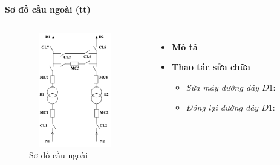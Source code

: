 \documentclass{beamer}
\begin{document}
\begin{frame}{\textbf{Sơ đồ cầu ngoài (tt)}}
\begin{columns}
\begin{figure}[h]
\includegraphics[width=4cm, height=5cm]{sdcn}
\caption{Sơ đồ cầu ngoài}
\end{figure}

\begin{itemize}
\item \textbf{Mô tả}
\item  \textbf{Thao tác sửa chữa}
\begin{itemize}
\item<1-> \emph{Sửa máy đường dây $D1$}: 
\item<1-> \emph{Đóng lại đường dây $D1$}: 
\end{itemize}
\end{itemize}
\end{columns}
\end{frame}
\end{document}

